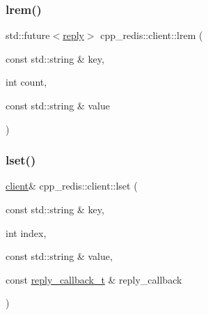 \mbox{\label{classcpp__redis_1_1client_a6581856beb86e871feb42d703cd1824a}} 
\subsubsection{\texorpdfstring{lrem()}{lrem()}\hspace{0.1cm}{\footnotesize\ttfamily [2/2]}}
{\footnotesize\ttfamily std\+::future$<$\hyperlink{classcpp__redis_1_1reply}{reply}$>$ cpp\+\_\+redis\+::client\+::lrem (\begin{DoxyParamCaption}\item[{const std\+::string \&}]{key,  }\item[{int}]{count,  }\item[{const std\+::string \&}]{value }\end{DoxyParamCaption})}

\mbox{\label{classcpp__redis_1_1client_a98e469104f97332c785d4c2f3d15150e}} 
\subsubsection{\texorpdfstring{lset()}{lset()}\hspace{0.1cm}{\footnotesize\ttfamily [1/2]}}
{\footnotesize\ttfamily \hyperlink{classcpp__redis_1_1client}{client}\& cpp\+\_\+redis\+::client\+::lset (\begin{DoxyParamCaption}\item[{const std\+::string \&}]{key,  }\item[{int}]{index,  }\item[{const std\+::string \&}]{value,  }\item[{const \hyperlink{classcpp__redis_1_1client_a061a1140d36d2eaeda82b09a0bb3f9f2}{reply\+\_\+callback\+\_\+t} \&}]{reply\+\_\+callback }\end{DoxyParamCaption})}

\mbox{\label{classcpp__redis_1_1client_a4c0d3955450ed6bda887688c863baa72}} 
